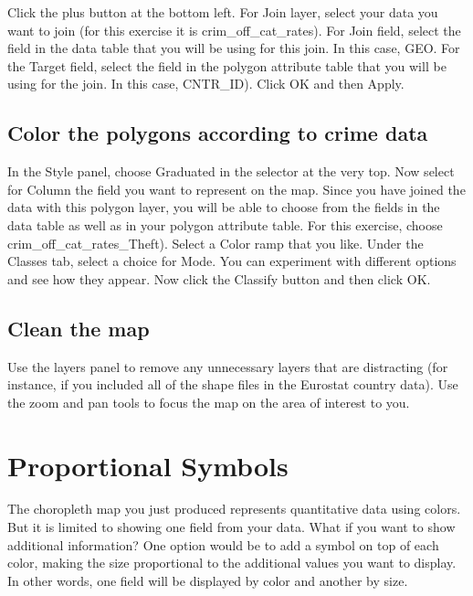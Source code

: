 \documentclass[]{book}
\begin{document}
Click the plus button at the bottom left. For Join layer, select your data you want to join (for this exercise it is crim\_off\_cat\_rates). For Join field, select the field in the data table that you will be using for this join. In this case, GEO. For the Target field, select the field in the polygon attribute table that you will be using for the join. In this case, CNTR\_ID). Click OK and then Apply.

\hypertarget{color-the-polygons-according-to-crime-data}{%
\subsection{Color the polygons according to crime data}\label{color-the-polygons-according-to-crime-data}}

In the Style panel, choose Graduated in the selector at the very top. Now select for Column the field you want to represent on the map. Since you have joined the data with this polygon layer, you will be able to choose from the fields in the data table as well as in your polygon attribute table. For this exercise, choose crim\_off\_cat\_rates\_Theft). Select a Color ramp that you like. Under the Classes tab, select a choice for Mode. You can experiment with different options and see how they appear. Now click the Classify button and then click OK.

\hypertarget{clean-the-map}{%
\subsection{Clean the map}\label{clean-the-map}}

Use the layers panel to remove any unnecessary layers that are distracting (for instance, if you included all of the shape files in the Eurostat country data). Use the zoom and pan tools to focus the map on the area of interest to you.

\hypertarget{proportional-symbols}{%
\section{Proportional Symbols}\label{proportional-symbols}}

The choropleth map you just produced represents quantitative data using colors. But it is limited to showing one field from your data. What if you want to show additional information? One option would be to add a symbol on top of each color, making the size proportional to the additional values you want to display. In other words, one field will be displayed by color and another by size.
\end{document}
